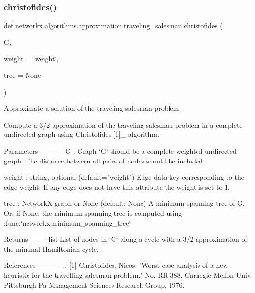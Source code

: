 \subsubsection{\texorpdfstring{christofides()}{christofides()}}
{\footnotesize\ttfamily def networkx.\+algorithms.\+approximation.\+traveling\+\_\+salesman.\+christofides (\begin{DoxyParamCaption}\item[{}]{G,  }\item[{}]{weight = {\ttfamily \char`\"{}weight\char`\"{}},  }\item[{}]{tree = {\ttfamily None} }\end{DoxyParamCaption})}

\begin{DoxyVerb}Approximate a solution of the traveling salesman problem

Compute a 3/2-approximation of the traveling salesman problem
in a complete undirected graph using Christofides [1]_ algorithm.

Parameters
----------
G : Graph
    `G` should be a complete weighted undirected graph.
    The distance between all pairs of nodes should be included.

weight : string, optional (default="weight")
    Edge data key corresponding to the edge weight.
    If any edge does not have this attribute the weight is set to 1.

tree : NetworkX graph or None (default: None)
    A minimum spanning tree of G. Or, if None, the minimum spanning
    tree is computed using :func:`networkx.minimum_spanning_tree`

Returns
-------
list
    List of nodes in `G` along a cycle with a 3/2-approximation of
    the minimal Hamiltonian cycle.

References
----------
.. [1] Christofides, Nicos. "Worst-case analysis of a new heuristic for
   the travelling salesman problem." No. RR-388. Carnegie-Mellon Univ
   Pittsburgh Pa Management Sciences Research Group, 1976.
\end{DoxyVerb}
 \mbox{\label{namespacenetworkx_1_1algorithms_1_1approximation_1_1traveling__salesman_a4cf9c28bf0139df1980bb84bc58a90d7}} 

